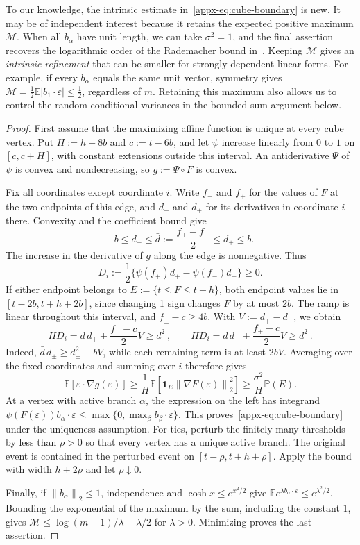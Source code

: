 \documentclass[11pt,letterpaper]{article}
\theoremstyle{remark}
\newcommand{\E}{\mathbb E}
\newcommand{\Pp}{\mathbb P}
\newcommand{\norm}[1]{\left\lVert#1\right\rVert}
\newcommand{\ind}{\mathbf 1}
\begin{document}
To our knowledge, the intrinsic estimate in~\eqref{appx-eq:cube-boundary}
is new. It may be of independent interest because it retains the
expected positive maximum \(\mathcal M\).
When all \(b_\alpha\) have unit length, we can take \(\sigma^2=1\),
and the final assertion recovers the logarithmic order of the
Rademacher bound in~\cite{OST,CCKK2022}. Keeping \(\mathcal M\)
gives an \emph{intrinsic refinement} that can be smaller for strongly
dependent linear forms. For example, if every \(b_\alpha\) equals
the same unit vector, symmetry gives
\(\mathcal M=\tfrac12\E|b_1\cdot\varepsilon|\le\tfrac12\),
regardless of \(m\). Retaining this maximum also allows us to control
the random conditional variances in the bounded-sum argument below.

\begin{proof}
First assume that the maximizing affine function is unique at every
cube vertex. Put \(H:=h+8b\) and \(c:=t-6b\), and let \(\psi\)
increase linearly from \(0\) to \(1\) on \([c,c+H]\), with constant
extensions outside this interval. An antiderivative \(\Psi\) of
\(\psi\) is convex and nondecreasing, so \(g:=\Psi\circ F\) is convex.

Fix all coordinates except coordinate \(i\). Write \(f_-\) and
\(f_+\) for the values of \(F\) at the two endpoints of this edge,
and \(d_-\) and \(d_+\) for its derivatives in coordinate \(i\)
there. Convexity and the coefficient bound give
\[
 -b\le d_-\le\bar d:=\frac{f_+-f_-}{2}\le d_+\le b.
\]
The increase in the derivative of \(g\) along the edge is nonnegative.
Thus
\[
 D_i:=\frac12\{\psi(f_+)d_+-\psi(f_-)d_-\}\ge0.
\]
If either endpoint belongs to \(E:=\{t\le F\le t+h\}\), both
endpoint values lie in \([t-2b,t+h+2b]\), since changing 1 sign
changes \(F\) by at most \(2b\). The ramp is linear throughout
this interval, and \(f_\pm-c\ge4b\). With \(V:=d_+-d_-\), we obtain
\[
 HD_i=\bar d\,d_++\frac{f_--c}{2}V\ge d_+^2,
 \qquad
 HD_i=\bar d\,d_-+\frac{f_+-c}{2}V\ge d_-^2.
\]
Indeed, \(\bar d\,d_\pm\ge d_\pm^2-bV\), while each remaining
term is at least \(2bV\). Averaging over the fixed coordinates
and summing over \(i\) therefore gives
\[
 \E[\varepsilon\cdot\nabla g(\varepsilon)]
 \ge\frac1H\E[\ind_E\norm{\nabla F(\varepsilon)}_2^2]
 \ge\frac{\sigma^2}{H}\Pp(E).
\]
At a vertex with active branch \(\alpha\), the expression on the
left has integrand
\(\psi(F(\varepsilon))b_\alpha\cdot\varepsilon
 \le\max\{0,\max_\beta b_\beta\cdot\varepsilon\}\).
This proves~\eqref{appx-eq:cube-boundary} under the uniqueness assumption.
For ties, perturb the finitely many thresholds by less than \(\rho>0\)
so that every vertex has a unique active branch. The original event
is contained in the perturbed event on \([t-\rho,t+h+\rho]\).
Apply the bound with width \(h+2\rho\) and let \(\rho\downarrow0\).

Finally, if \(\norm{b_\alpha}_2\le1\), independence and
\(\cosh x\le e^{x^2/2}\) give
\(\E e^{\lambda b_\alpha\cdot\varepsilon}\le e^{\lambda^2/2}\).
Bounding the exponential of the maximum by the sum, including
the constant \(1\), gives
\(\mathcal M\le\log(m+1)/\lambda+\lambda/2\) for \(\lambda>0\).
Minimizing proves the last assertion.
\end{proof}
\end{document}
